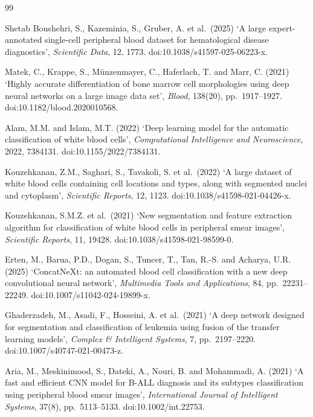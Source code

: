\documentclass[11pt]{article}
\begin{document}
\begin{thebibliography}{99}

Shetab Boushehri, S., Kazeminia, S., Gruber, A. et al.\ (2025)
`A large expert-annotated single-cell peripheral blood dataset for hematological
disease diagnostics', \emph{Scientific Data}, 12, 1773.
doi:10.1038/s41597-025-06223-x.

Matek, C., Krappe, S., Münzenmayer, C., Haferlach, T. and Marr, C. (2021)
`Highly accurate differentiation of bone marrow cell morphologies using deep
neural networks on a large image data set', \emph{Blood}, 138(20),
pp.\ 1917--1927. doi:10.1182/blood.2020010568.

Alam, M.M. and Islam, M.T. (2022)
`Deep learning model for the automatic classification of white blood cells',
\emph{Computational Intelligence and Neuroscience}, 2022, 7384131.
doi:10.1155/2022/7384131.

Kouzehkanan, Z.M., Saghari, S., Tavakoli, S. et al.\ (2022)
`A large dataset of white blood cells containing cell locations and types,
along with segmented nuclei and cytoplasm', \emph{Scientific Reports}, 12, 1123.
doi:10.1038/s41598-021-04426-x.

Kouzehkanan, S.M.Z. et al.\ (2021)
`New segmentation and feature extraction algorithm for classification of white
blood cells in peripheral smear images', \emph{Scientific Reports}, 11, 19428.
doi:10.1038/s41598-021-98599-0.

Erten, M., Barua, P.D., Dogan, S., Tuncer, T., Tan, R.-S. and Acharya, U.R.
(2025) `ConcatNeXt: an automated blood cell classification with a new deep
convolutional neural network', \emph{Multimedia Tools and Applications}, 84,
pp.\ 22231--22249. doi:10.1007/s11042-024-19899-x.

Ghaderzadeh, M., Asadi, F., Hosseini, A. et al.\ (2021)
`A deep network designed for segmentation and classification of leukemia using
fusion of the transfer learning models', \emph{Complex \& Intelligent Systems},
7, pp.\ 2197--2220. doi:10.1007/s40747-021-00473-z.

Aria, M., Meskinimood, S., Dateki, A., Nouri, B. and Mohammadi, A. (2021)
`A fast and efficient CNN model for B-ALL diagnosis and its subtypes
classification using peripheral blood smear images',
\emph{International Journal of Intelligent Systems}, 37(8), pp.\ 5113--5133.
doi:10.1002/int.22753.


\end{thebibliography}
\end{document}

